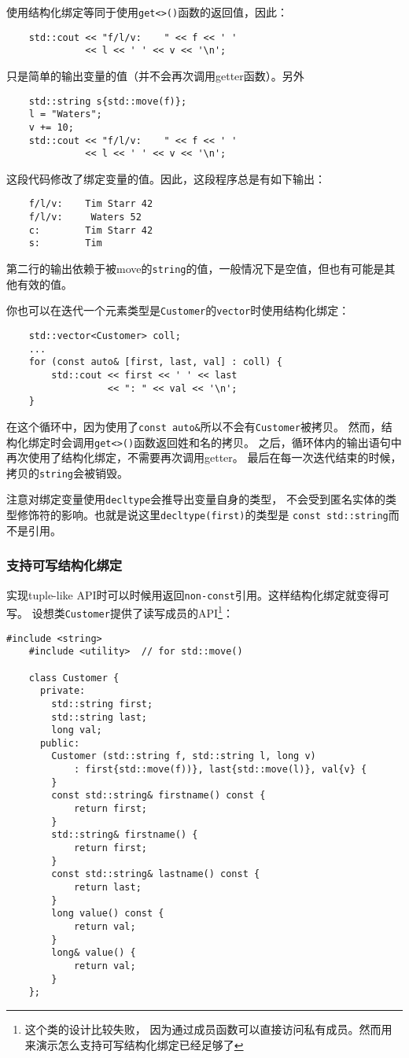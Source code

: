 使用结构化绑定等同于使用\texttt{get<>()}函数的返回值，因此：
\begin{lstlisting}
    std::cout << "f/l/v:    " << f << ' '
              << l << ' ' << v << '\n';
\end{lstlisting}
只是简单的输出变量的值（并不会再次调用getter函数）。另外
\begin{lstlisting}
    std::string s{std::move(f)};
    l = "Waters";
    v += 10;
    std::cout << "f/l/v:    " << f << ' '
              << l << ' ' << v << '\n';
\end{lstlisting}
这段代码修改了绑定变量的值。因此，这段程序总是有如下输出：
\begin{lstlisting}
    f/l/v:    Tim Starr 42
    f/l/v:     Waters 52
    c:        Tim Starr 42
    s:        Tim
\end{lstlisting}
第二行的输出依赖于被move的\texttt{string}的值，一般情况下是空值，但也有可能是其他有效的值。

你也可以在迭代一个元素类型是\texttt{Customer}的\texttt{vector}时使用结构化绑定：
\begin{lstlisting}
    std::vector<Customer> coll;
    ...
    for (const auto& [first, last, val] : coll) {
        std::cout << first << ' ' << last
                  << ": " << val << '\n';
    }
\end{lstlisting}
在这个循环中，因为使用了\texttt{const auto\&}所以不会有\texttt{Customer}被拷贝。
然而，结构化绑定时会调用\texttt{get<>()}函数返回姓和名的拷贝。
之后，循环体内的输出语句中再次使用了结构化绑定，不需要再次调用getter。
最后在每一次迭代结束的时候，拷贝的\texttt{string}会被销毁。

注意对绑定变量使用\texttt{decltype}会推导出变量自身的类型，
不会受到匿名实体的类型修饰符的影响。也就是说这里\texttt{decltype(first)}的类型是
\texttt{const std::string}而不是引用。

\subsubsection*{支持可写结构化绑定}
实现tuple-like API时可以时候用返回\texttt{non-const}引用。这样结构化绑定就变得可写。
设想类\texttt{Customer}提供了读写成员的API\footnote{这个类的设计比较失败，
因为通过成员函数可以直接访问私有成员。然而用来演示怎么支持可写结构化绑定已经足够了}：
\begin{lstlisting}[frame=single, title=lang/customer2.hpp]
    #include <string>
    #include <utility>  // for std::move()

    class Customer {
      private:
        std::string first;
        std::string last;
        long val;
      public:
        Customer (std::string f, std::string l, long v)
            : first{std::move(f))}, last{std::move(l)}, val{v} {
        }
        const std::string& firstname() const {
            return first;
        }
        std::string& firstname() {
            return first;
        }
        const std::string& lastname() const {
            return last;
        }
        long value() const {
            return val;
        }
        long& value() {
            return val;
        }
    };
\end{lstlisting}


